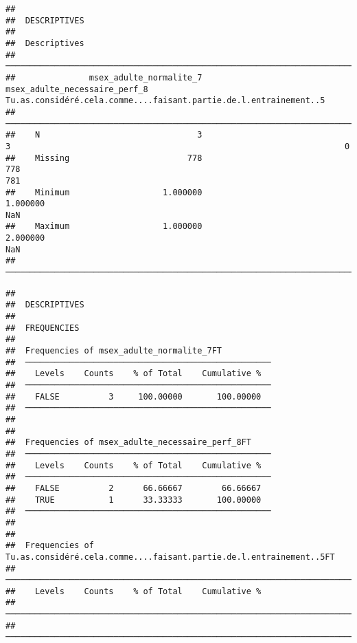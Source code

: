 \documentclass[
]{article}
\begin{document}
\begin{verbatim}
## 
##  DESCRIPTIVES
## 
##  Descriptives                                                                                                                                 
##  ──────────────────────────────────────────────────────────────────────────────────────────────────────────────────────────────────────────── 
##               msex_adulte_normalite_7    msex_adulte_necessaire_perf_8    Tu.as.considéré.cela.comme....faisant.partie.de.l.entrainement..5   
##  ──────────────────────────────────────────────────────────────────────────────────────────────────────────────────────────────────────────── 
##    N                                3                                3                                                                    0   
##    Missing                        778                              778                                                                  781   
##    Minimum                   1.000000                         1.000000                                                                  NaN   
##    Maximum                   1.000000                         2.000000                                                                  NaN   
##  ────────────────────────────────────────────────────────────────────────────────────────────────────────────────────────────────────────────
\end{verbatim}

\begin{verbatim}
## 
##  DESCRIPTIVES
## 
##  FREQUENCIES
## 
##  Frequencies of msex_adulte_normalite_7FT           
##  ────────────────────────────────────────────────── 
##    Levels    Counts    % of Total    Cumulative %   
##  ────────────────────────────────────────────────── 
##    FALSE          3     100.00000       100.00000   
##  ────────────────────────────────────────────────── 
## 
## 
##  Frequencies of msex_adulte_necessaire_perf_8FT     
##  ────────────────────────────────────────────────── 
##    Levels    Counts    % of Total    Cumulative %   
##  ────────────────────────────────────────────────── 
##    FALSE          2      66.66667        66.66667   
##    TRUE           1      33.33333       100.00000   
##  ────────────────────────────────────────────────── 
## 
## 
##  Frequencies of Tu.as.considéré.cela.comme....faisant.partie.de.l.entrainement..5FT 
##  ────────────────────────────────────────────────────────────────────────────────── 
##    Levels    Counts    % of Total    Cumulative %   
##  ────────────────────────────────────────────────────────────────────────────────── 
##  ──────────────────────────────────────────────────────────────────────────────────
\end{verbatim}
\end{document}

